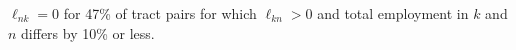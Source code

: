 $ \ell_{nk}=0$ for 47\% of tract pairs for which $ \ell_{kn}>0$ and total employment in $ k$ and $ n$ differs by 10\% or less.
